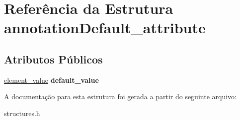 \hypertarget{structannotationDefault__attribute}{}\section{Referência da Estrutura annotation\+Default\+\_\+attribute}
\label{structannotationDefault__attribute}
\subsection*{Atributos Públicos}
\begin{DoxyCompactItemize}
\item 
\mbox{\label{structannotationDefault__attribute_a18525b7817b25760609cda9ebaadfbb3}} 
\hyperlink{structelement__value}{element\+\_\+value} {\bfseries default\+\_\+value}
\end{DoxyCompactItemize}


A documentação para esta estrutura foi gerada a partir do seguinte arquivo\+:\begin{DoxyCompactItemize}
\item 
structures.\+h\end{DoxyCompactItemize}
